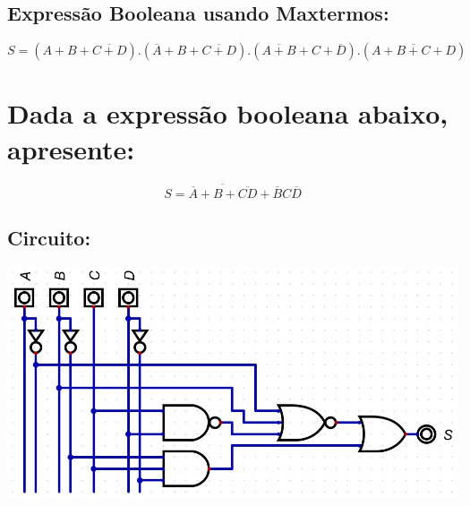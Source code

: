 \documentclass{article}
\begin{document}
			\subsection{Expressão Booleana usando Maxtermos:}
			\begin{equation*}
				S = (A+B+\overline{C+D}).(\overline{A}+B+\overline{C+D}).(\overline{A+B}+C+\overline{D}).(\overline{A+B+C+D})
			\end{equation*}
		
		
	\section{Dada a expressão booleana abaixo, apresente:}
		\begin{equation*}
			S = \overline{\overline{A} + B + \overline{CD}} + \overline{B}C\overline{D}
		\end{equation*}
		\subsection{Circuito:}
			\includegraphics[scale=0.6]{Images/CIRCUITO B.jpg}
\end{document}

